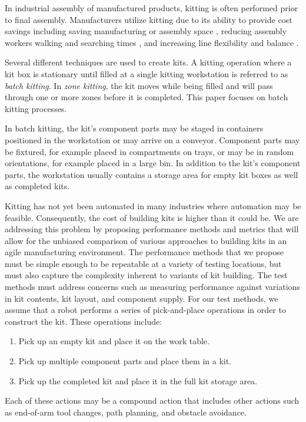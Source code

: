 In industrial assembly of manufactured products, kitting is
often performed prior to final assembly. Manufacturers utilize kitting
due to its ability to provide cost savings \cite{Carlsson_2008}
including saving manufacturing or assembly space \cite{Medbo2003},
reducing assembly workers walking and searching times \cite{Schwind1992},
and increasing line flexibility \cite{Bozer1992} and balance \cite{Jiao2000}.

Several different techniques are used to create kits. A kitting
operation where a kit box is stationary until filled at a single
kitting workstation is referred to as {\it batch kitting}.
In {\it zone kitting}, the kit moves while being filled and will pass through one or
more zones before it is completed. This paper focuses on batch kitting processes.

In batch kitting, the kit's component parts may be staged in
containers positioned in the workstation or may arrive on a conveyor.
Component parts may be fixtured, for example placed in compartments
on trays, or may be in random orientations, for example
placed in a large bin. In addition to the kit's component parts,
the workstation usually contains a storage area for empty kit boxes as
well as completed kits.

Kitting has not yet been automated in many industries where
automation may be feasible. Consequently, the cost of building
kits is higher than it could be. We are addressing this problem
by proposing performance methods and metrics that will allow for
the unbiased comparison of various approaches to building kits
in an agile manufacturing environment. The performance methods
that we propose must be simple enough to be repeatable at a variety of
testing locations, but must also capture the complexity inherent
to variants of kit building. The test methods must address concerns such as
measuring performance against variations in kit contents, kit
layout, and component supply. For our test methods, we assume that
a robot performs a series of pick-and-place operations
in order to construct the kit. These operations include:
\begin{enumerate}
\item Pick up an empty kit and place it on the work table.
\item Pick up multiple component parts and place them in a kit.
\item Pick up the completed kit and place it in the full kit storage area.
\end{enumerate}
Each of these actions may be a compound action that includes
other actions such as end-of-arm tool changes, path planning,
and obstacle avoidance.

